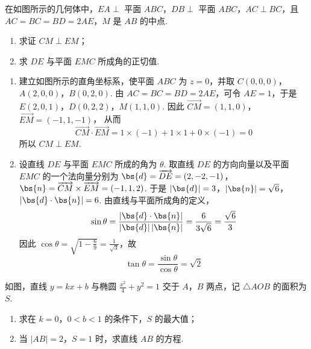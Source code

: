 \begin{problem}
在如图所示的几何体中，\(EA \perp\) 平面 \(ABC\)，\(DB \perp\) 平面 \(ABC\)，\(AC \perp BC\)，且 \(AC = BC = BD = 2AE\)，\(M\) 是 \(AB\) 的中点.
\begin{enumerate}
\item 求证 \(CM \perp EM\)；
\item 求 \(DE\) 与平面 \(EMC\) 所成角的正切值.
\end{enumerate}

\end{problem}

\begin{solution}
\begin{enumerate}
\item 建立如图所示的直角坐标系，使平面 \(ABC\) 为 \(z=0\)，并取 \(C(0,0,0)\)，\(A(2,0,0)\)，\(B(0,2,0)\).
由 \(AC=BC=BD=2AE\)，可令 \(AE=1\)，于是
\(E(2,0,1)\)，\(D(0,2,2)\)，\(M(1,1,0)\).
因此 \(\overrightarrow{CM}=(1,1,0)\)，\(\overrightarrow{EM}=(-1,1,-1)\)，
从而
\[
\overrightarrow{CM}\cdot\overrightarrow{EM}=1\times(-1)+1\times1+0\times(-1)=0
\]
所以 \(CM\perp EM\).

\item 设直线 \(DE\) 与平面 \(EMC\) 所成的角为 \(\theta\). 取直线 \(DE\) 的方向向量以及平面 \(EMC\) 的一个法向量分别为
\(\bs{d}=\overrightarrow{DE}=(2,-2,-1)\)，\(\bs{n}=\overrightarrow{CM}\times\overrightarrow{EM}=(-1,1,2)\).
于是
\(|\bs{d}|=3\)，\(|\bs{n}|=\sqrt{6}\)，\(|\bs{d}\cdot\bs{n}|=6\).
由直线与平面所成角的定义，
\[
\sin\theta=\frac{|\bs{d}\cdot\bs{n}|}{|\bs{d}|\,|\bs{n}|}=\frac{6}{3\sqrt{6}}=\frac{\sqrt{6}}{3}
\]
因此 \(\cos\theta=\sqrt{1-\frac{6}{9}}=\frac{1}{\sqrt{3}}\)，故
\[
\tan\theta=\frac{\sin\theta}{\cos\theta}=\sqrt{2}
\]
\end{enumerate}
\end{solution}

\begin{problem}
如图，直线 \( y = kx + b \) 与椭圆 \( \frac{x^2}{4} + y^2 = 1 \) 交于 \(A\)，\(B\) 两点，记 \( \triangle AOB \) 的面积为 \(S\).
\begin{enumerate}
\item 求在 \(k = 0\)，\(0 < b < 1\) 的条件下，\(S\) 的最大值；
\item 当 \(\left|AB\right|=2\)，\(S=1\) 时，求直线 \(AB\) 的方程.
\end{enumerate}

\end{problem}

